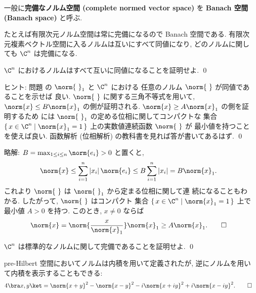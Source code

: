 \documentclass[12pt,twoside]{jarticle}
\newcommand\commentout[1]{#1}
\newcommand\commentout[1]{}
\begin{document}
一般に{\bf 完備なノルム空間 (complete normed vector space)} を 
{\bf Banach 空間 (Banach space)} と呼ぶ. 

たとえば有限次元ノルム空間は常に完備になるので Banach 空間である. 
有限次元複素ベクトル空間に入るノルムは互いにすべて同値になり, 
どのノルムに関しても $\C^n$ は完備になる.

\begin{question}
\label{q:norm-equiv}
  $\C^n$ におけるノルムはすべて互いに同値になることを証明せよ. \qed
\end{question}

\noindent
ヒント: 問題  の $\norm{{\ }}_1$ と $\C^n$ における
任意のノルム $\norm{{\ }}$ が同値であることを示せば
良い.  $\norm{{\ }}$ に関する三角不等式を用いて, $\norm{x}\le B \norm{x}_1$ 
の側が証明される.  $\norm{x}\ge A \norm{x}_1$ の側を証明するため
には $\norm{{\ }}_1$ の定める位相に関してコンパクトな
集合 $\{\,x\in\C^n\mid\norm{x}_1=1\,\}$ 上の実数値連続函数 $\norm{{\ }}$ が
最小値を持つことを使えば良い.
函数解析 (位相解析) の教科書を見れば答が書いてあるはず.
\qed

\commentout{
\medskip
\noindent
略解: $B=\max_{1\le i\le n}\norm{e_i} > 0$ と置くと,
\begin{equation*}
  \norm{x} 
  \le \sum_{i=1}^n |x_i|\,\norm{e_i} 
  \le B \sum_{i=1}^n |x_i|
  = B \norm{x}_1.
\end{equation*}
これより $\norm{{\ }}$ は $\norm{{\ }}_1$ から定まる位相に関して連
続になることもわかる.  したがって, $\norm{{\ }}$ はコンパクト
集合 $\{\,x\in\C^n\mid\norm{x}_1=1\,\}$ 上で最小値 $A>0$ を持つ. 
このとき, $x\ne0$ ならば
\begin{equation*}
  \norm{x}
  = \norm{\frac{x}{\norm{x}_1}} \norm{x}_1
  \ge A \norm{x}_1.
  \qed
\end{equation*}
}


\begin{question}
  $\C^n$ は標準的なノルムに関して完備であることを証明せよ. \qed
\end{question}


\begin{question}
\label{q:inner=norm}
  pre-Hilbert 空間においてノルムは内積を用いて定義されたが, 
  逆にノルムを用いて内積を表示することもできる:
  \begin{equation*}
    4\bra x,y\ket 
    = \norm{x+y}^2 - \norm{x-y}^2 - i\norm{x+iy}^2 + i\norm{x-iy}^2.
    \qed
  \end{equation*}
\end{question}
\end{document}
